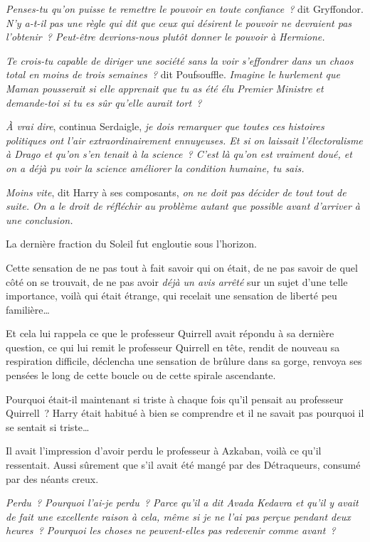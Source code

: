 \emph{Penses-tu qu'on puisse te remettre le pouvoir en toute confiance~?} dit Gryffondor. \emph{N'y a-t-il pas une règle qui dit que ceux qui désirent le pouvoir ne devraient pas l'obtenir~? Peut-être devrions-nous plutôt donner le pouvoir à Hermione.}

\emph{Te crois-tu capable de diriger une société sans la voir s'effondrer dans un chaos total en moins de trois semaines~?} dit Poufsouffle. \emph{Imagine le hurlement que Maman pousserait si elle apprenait que tu as été élu Premier Ministre et demande-toi si tu es sûr qu'elle aurait tort~?}

\emph{À vrai dire}, continua Serdaigle, \emph{je dois remarquer que toutes ces histoires politiques ont l'air extraordinairement ennuyeuses. Et si on laissait l'électoralisme à Drago et qu'on s'en tenait à la science~? C'est là qu'on est vraiment doué, et on a déjà pu voir la science améliorer la condition humaine, tu sais.}

\emph{Moins vite}, dit Harry à ses composants, \emph{on ne doit pas décider de tout tout de suite. On a le droit de réfléchir au problème autant que possible avant d'arriver à une conclusion.}

La dernière fraction du Soleil fut engloutie sous l'horizon.

Cette sensation de ne pas tout à fait savoir qui on était, de ne pas savoir de quel côté on se trouvait, de ne pas avoir \emph{déjà un avis arrêté} sur un sujet d'une telle importance, voilà qui était étrange, qui recelait une sensation de liberté peu familière…

Et cela lui rappela ce que le professeur Quirrell avait répondu à sa dernière question, ce qui lui remit le professeur Quirrell en tête, rendit de nouveau sa respiration difficile, déclencha une sensation de brûlure dans sa gorge, renvoya ses pensées le long de cette boucle ou de cette spirale ascendante.

Pourquoi était-il maintenant si triste à chaque fois qu'il pensait au professeur Quirrell~? Harry était habitué à bien se comprendre et il ne savait pas pourquoi il se sentait si triste…

Il avait l'impression d'avoir perdu le professeur à Azkaban, voilà ce qu'il ressentait. Aussi sûrement que s'il avait été mangé par des Détraqueurs, consumé par des néants creux.

\emph{Perdu~? Pourquoi l'ai-je perdu~? Parce qu'il a dit Avada Kedavra et qu'il y avait de fait une excellente raison à cela, même si je ne l'ai pas perçue pendant deux heures~? Pourquoi les choses ne peuvent-elles pas redevenir comme avant~?}

